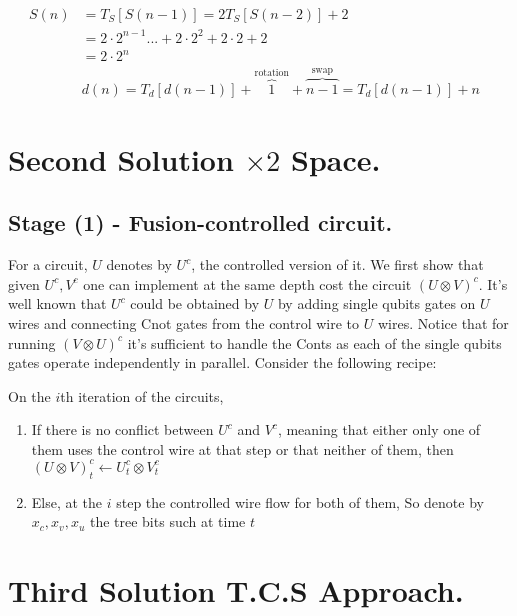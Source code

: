 \documentclass[manuscript,screen,review]{acmart}
\begin{document}
 $$ \begin{split} S(n) & = T_{S}[S(n-1)] = 2T_{S}[S(n-2)] + 2  & \\ & = 
2\cdot 2^{n - 1}...+2\cdot 2^{2} +2\cdot 2 + 2 & \\ & = 2\cdot 2^{n} & \\ & d(n) = T_{d}[d(n-1)] + \overbrace{1}^{ \text{rotation} } + \overbrace{n-1}^{\text{swap}} =  T_{d}[d(n-1)] + n   \end{split} $$

\section{Second Solution $\times 2$ Space. }

\subsection{Stage (1) - Fusion-controlled circuit.}

For a circuit, $U$ denotes by $U^{c}$, the controlled version of it. We first show that given $U^{c},V^{c}$ one can implement at the same depth cost the circuit $(U\otimes V)^{c}$. It's well known that $U^{c}$ could be obtained by $U$ by adding single qubits gates on $U$ wires and connecting Cnot gates from the control wire to $U$ wires. Notice that for running $(V\otimes U)^{c}$ it's sufficient to handle the Conts as each of the single qubits gates operate independently in parallel. Consider the following recipe: 

On the $i$th iteration of the circuits,
\begin{enumerate}  
  \item If there is no conflict between $U^{c}$ and $V^{c}$, meaning that either only one of them uses the control wire at that step or that neither of them, then $(U \otimes V)^{c}_{t} \leftarrow U^{c}_{t} \otimes V^{c}_{t}$
  \item Else, at the $i$ step the controlled wire flow for both of them, So denote by $ x_{c},x_{v},x_{u}$ the tree bits such at time $t$   

\end{enumerate}
  
 

\section{Third Solution T.C.S Approach.}  

\printbibliography
\end{document}
